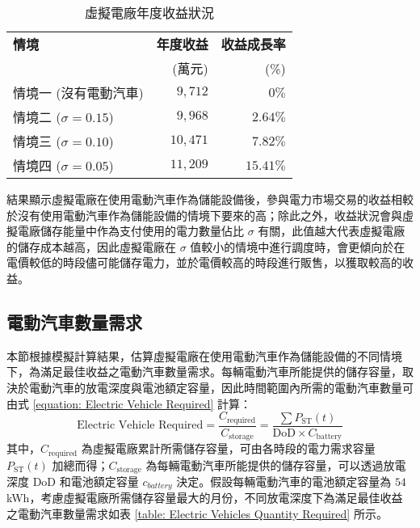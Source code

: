 \begin{table}[htbp]
  \centering
  \caption[虛擬電廠年度收益狀況]{虛擬電廠年度收益狀況}
  \begin{tabular}{lrr}
    \toprule
    \textbf{情境} & \textbf{年度收益} & \textbf{收益成長率} \\
                  & (萬元) & (\%) \\
    \midrule
    情境一 (沒有電動汽車)  & $9,712$ & $0 \%$ \\
    情境二 ($\sigma = 0.15$)  & $9,968$ & $2.64 \%$ \\
    情境三 ($\sigma = 0.10$)  & $10,471$ & $7.82 \%$ \\
    情境四 ($\sigma = 0.05$)  & $11,209$ & $15.41 \%$ \\
    \bottomrule
  \end{tabular}
  \label{table: Profit with or without Electric Vehicles}
\end{table}

結果顯示虛擬電廠在使用電動汽車作為儲能設備後，參與電力市場交易的收益相較於沒有使用電動汽車作為儲能設備的情境下要來的高；除此之外，收益狀況會與虛擬電廠儲存能量中作為支付使用的電力數量佔比 $\sigma$ 有關，此值越大代表虛擬電廠的儲存成本越高，因此虛擬電廠在 $\sigma$ 值較小的情境中進行調度時，會更傾向於在電價較低的時段儘可能儲存電力，並於電價較高的時段進行販售，以獲取較高的收益。

\subsection{電動汽車數量需求}

本節根據模擬計算結果，估算虛擬電廠在使用電動汽車作為儲能設備的不同情境下，為滿足最佳收益之電動汽車數量需求。每輛電動汽車所能提供的儲存容量，取決於電動汽車的放電深度與電池額定容量，因此時間範圍內所需的電動汽車數量可由式 \eqref{equation: Electric Vehicle Required} 計算：
\begin{equation}\label{equation: Electric Vehicle Required}
  \text{Electric Vehicle Required} = \frac{C_{\text{required}}}{C_{\text{storage}}} = \frac{\sum P_{\text{ST}}(t)}{\text{DoD} \times C_{\text{battery}}}
\end{equation}
%
其中，$C_{\text{required}}$ 為虛擬電廠累計所需儲存容量，可由各時段的電力需求容量 $P_{\text{ST}}(t)$ 加總而得；$C_{\text{storage}}$ 為每輛電動汽車所能提供的儲存容量，可以透過放電深度 $\text{DoD}$ 和電池額定容量 $c_{battery}$ 決定。假設每輛電動汽車的電池額定容量為 $54$ \si{\kWh}，考慮虛擬電廠所需儲存容量最大的月份，不同放電深度下為滿足最佳收益之電動汽車數量需求如表 \ref{table: Electric Vehicles Quantity Required} 所示。

